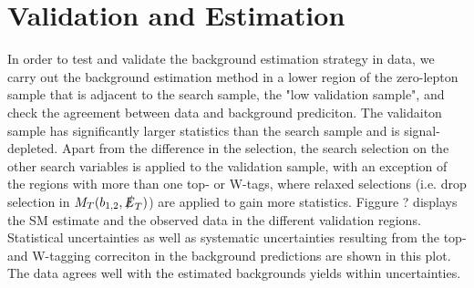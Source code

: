\chapter{Validation and Estimation}
\label{ch:ValandEst}

In order to test and validate the background estimation strategy in data, we carry out the background estimation method in a lower \met{} region of the zero-lepton sample that is adjacent to the search sample, the "low \met{} validation sample", and check the agreement between data and background prediciton. The validaiton sample has significantly larger statistics than the search sample and is signal-depleted. Apart from the difference in the \met{} selection, the search selection on the other search variables is applied to the validation sample, with an exception of the regions with more than one top- or W-tags, where relaxed selections (i.e. drop selection in $M_T(b_{1,2},\slashed{E}_{T})$) are applied to gain more statistics. Figgure ? displays the SM estimate and the observed data in the different validation regions. Statistical uncertainties as well as systematic uncertainties resulting from the top- and W-tagging correciton in the background predictions are shown in this plot. The data agrees well with the estimated backgrounds yields within uncertainties. 

